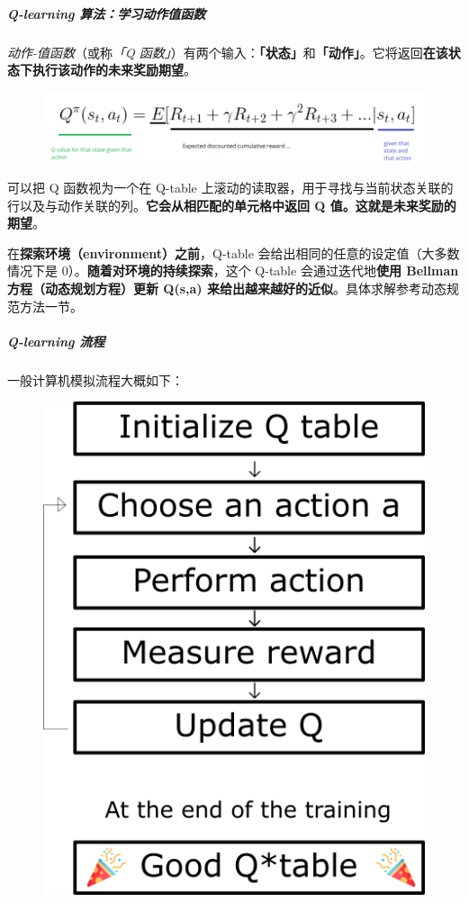 \documentclass[UTF8,a4paper,12pt]{ctexbook}
\begin{document}
				\subparagraph{Q-learning 算法：学习动作值函数}
					\textit{动作-值函数}（或称\textit{「Q 函数」}）有两个输入：\textbf{「状态」}和\textbf{「动作」}。它将返回\textbf{在该状态下执行该动作的未来奖励期望}。
					
					\begin{figure}[H]
						\centering
						\includegraphics[width=\linewidth]{qFunc}
					\end{figure}
					
					可以把 Q 函数视为一个在 Q-table 上滚动的读取器，用于寻找与当前状态关联的行以及与动作关联的列。\textbf{它会从相匹配的单元格中返回 Q 值。这就是未来奖励的期望}。
					
					在\textbf{探索环境（environment）之前}，Q-table 会给出相同的任意的设定值（大多数情况下是 0）。\textbf{随着对环境的持续探索}，这个 Q-table 会通过迭代地\textbf{使用 Bellman 方程（动态规划方程）更新 Q(s,a) 来给出越来越好的近似}。具体求解参考动态规范方法一节。
					
				\subparagraph{Q-learning 流程}
					一般计算机模拟流程大概如下：
					
					\begin{figure}[H]
						\centering
						\includegraphics[width=.4\linewidth]{qFuncProcess}
					\end{figure}
				
\end{document}
